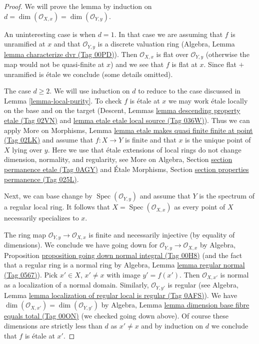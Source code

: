 \documentclass{amsart}
\theoremstyle{plain}
\theoremstyle{definition}
\theoremstyle{remark}
\numberwithin{equation}{subsection}
\def\Spec{\mathop{\mathrm{Spec}}}
\begin{document}
\begin{proof}
We will prove the lemma by induction on
$d = \dim(\mathcal{O}_{X, x}) = \dim(\mathcal{O}_{Y, y})$.

\medskip\noindent
An uninteresting case is when $d = 1$.
In that case we are assuming that $f$ is unramified at $x$
and that $\mathcal{O}_{Y, y}$ is a discrete valuation ring
(Algebra, Lemma \href{https://stacks.math.columbia.edu/tag/00PD}{lemma characterize dvr (Tag 00PD)}).
Then $\mathcal{O}_{X, x}$ is flat over $\mathcal{O}_{Y, y}$
(otherwise the map would not be quasi-finite at $x$)
and we see that $f$ is flat at $x$. Since flat $+$
unramified is \'etale we conclude (some details omitted).

\medskip\noindent
The case $d \geq 2$. We will use induction on $d$ to reduce
to the case discussed in Lemma \ref{lemma-local-purity}.
To check $f$ is \'etale at $x$ we may work \'etale locally
on the base and on the target
(Descent, Lemmas \href{https://stacks.math.columbia.edu/tag/02VN}{lemma descending property etale (Tag 02VN)} and
\href{https://stacks.math.columbia.edu/tag/036W}{lemma etale etale local source (Tag 036W)}).
Thus we can apply More on Morphisms, Lemma
\href{https://stacks.math.columbia.edu/tag/02LK}{lemma etale makes quasi finite finite at point (Tag 02LK)}
and assume that $f : X \to Y$ is finite and that $x$ is the unique
point of $X$ lying over $y$. Here we use that \'etale extensions of
local rings do not change dimension, normality, and regularity, see
More on Algebra, Section \href{https://stacks.math.columbia.edu/tag/0AGY}{section permanence etale (Tag 0AGY)}
and
\'Etale Morphisms, Section \href{https://stacks.math.columbia.edu/tag/025L}{section properties permanence (Tag 025L)}.

\medskip\noindent
Next, we can base change by $\Spec(\mathcal{O}_{Y, y})$
and assume that $Y$ is the spectrum of a regular local ring.
It follows that $X = \Spec(\mathcal{O}_{X, x})$ as
every point of $X$ necessarily specializes to $x$.

\medskip\noindent
The ring map $\mathcal{O}_{Y, y} \to \mathcal{O}_{X, x}$ is
finite and necessarily injective (by equality of dimensions).
We conclude we have going down for
$\mathcal{O}_{Y, y} \to \mathcal{O}_{X, x}$ by
Algebra, Proposition \href{https://stacks.math.columbia.edu/tag/00H8}{proposition going down normal integral (Tag 00H8)}
(and the fact that a regular ring is a normal ring by
Algebra, Lemma \href{https://stacks.math.columbia.edu/tag/0567}{lemma regular normal (Tag 0567)}).
Pick $x' \in X$, $x' \not = x$ with image $y' = f(x')$.
Then $\mathcal{O}_{X, x'}$ is normal as a localization
of a normal domain. Similarly, $\mathcal{O}_{Y, y'}$ is
regular (see Algebra, Lemma
\href{https://stacks.math.columbia.edu/tag/0AFS}{lemma localization of regular local is regular (Tag 0AFS)}).
We have $\dim(\mathcal{O}_{X, x'}) = \dim(\mathcal{O}_{Y, y'})$ by
Algebra, Lemma \href{https://stacks.math.columbia.edu/tag/00ON}{lemma dimension base fibre equals total (Tag 00ON)}
(we checked going down above).
Of course these dimensions are strictly less than $d$ as $x' \not = x$
and by induction on $d$ we conclude that $f$ is \'etale at $x'$.


\end{proof}
\end{document}
